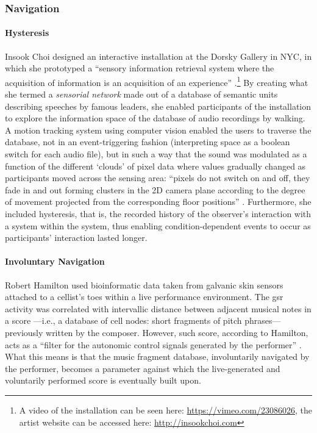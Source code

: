 \subsubsection{Navigation}
\label{applications:navigation}

\paragraph{Hysteresis}
Insook Choi \parencite{icmc/bbp2372.2000.146} designed an interactive installation at the Dorsky Gallery in NYC, in which she prototyped a ``sensory information retrieval system where the acquisition of information is an acquisition of an experience'' \parencite{icmc/bbp2372.2000.146}.\footnote{A video of the installation can be seen here: \url{https://vimeo.com/23086026}, the artist website can be accessed here: \url{http://insookchoi.com}} By creating what she termed a \textit{sensorial network} made out of a database of semantic units describing speeches by famous leaders, she enabled participants of the installation to explore the information space of the database of audio recordings by walking. A motion tracking system using computer vision enabled the users to traverse the database, not in an event-triggering fashion (interpreting space as a boolean switch for each audio file), but in such a way that the sound was modulated as a function of the different `clouds' of pixel data where values gradually changed as participants moved across the sensing area: ``pixels do not switch on and off, they fade in and out forming clusters in the 2D camera plane according to the degree of movement projected from the corresponding floor positions'' \parencite{icmc/bbp2372.2000.146}. Furthermore, she included hysteresis, that is, the recorded history of the observer's interaction with a system within the system, thus enabling condition-dependent events to occur as participants' interaction lasted longer.

\paragraph{Involuntary Navigation}
Robert Hamilton \parencite{icmc/bbp2372.2006.123} used bioinformatic data taken from galvanic skin sensors attached to a cellist's toes within a live performance environment. The \gls{gsr} activity was correlated with intervallic distance between adjacent musical notes in a score ---i.e., a database of cell nodes: short fragments of pitch phrases--- previously written by the composer. However, such score, according to Hamilton, acts as a ``filter for the autonomic control signals generated by the performer'' \parencite[601]{icmc/bbp2372.2006.123}. What this means is that the music fragment database, involuntarily navigated by the performer, becomes a parameter against which the live-generated and voluntarily performed score is eventually built upon.

